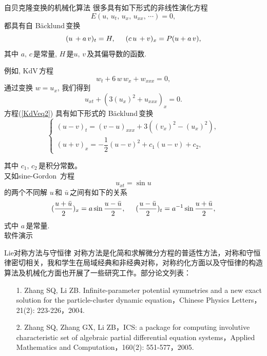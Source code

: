 \documentclass{beamer}
\begin{document}
\begin{frame}{自贝克隆变换的机械化算法}
很多具有如下形式的非线性演化方程
\begin{equation}\label{eq344}
E(u,\,u_t,\,u_x,\,u_{xx},\,\cdots)=0,
\end{equation}
都具有自 B\"{a}cklund\,变换
\begin{equation}\label{eq345}
(u\,+ a\,v)_t = H,\hskip 0.5cm (c\,u\, + v)_x =P(u + a\,v),
\end{equation}
其中 $a,\,c$\,是常量, $H$\,是$u,\,v$\,及其偏导数的函数.

例如, KdV\,方程
\begin{equation}\label{KdV}
w_t+6\,w\,w_x+w_{xxx}=0,
\end{equation}
通过变换 $w=u_x$, 我们得到
\begin{equation}\label{KdVeq2}
u_{xt}+(3(u_x)^2+u_{xxx})_x=0.
\end{equation}
方程(\ref{KdVeq2}) 具有如下形式的 B\"{a}cklund\,变换
\begin{equation}\label{KdV_BT}
\left \{
\begin{array}{ll}
(u-v)_t=(v-u)_{xxx}+3((v_x)^2-(u_x)^2), \\[2mm]
(u+v)_x=-\dfrac{1}{2}(u-v)^2+c_1(u-v)+c_2,
\end{array}
\right.
\end{equation}
\end{frame}
\begin{frame}
其中 $c_1,\,c_2$\,是积分常数。\\[1mm]

又如sine-Gordon\, 方程
\[
  u_{xt} = \sin u
\]
的两个不同解 $u$\,和 $\bar{u}$\,之间有如下的关系
\begin{equation}
(\dfrac{u +\bar{u}}{2})_x = a \sin \dfrac{u-\bar{u}}{2}, \hskip
0.5cm (\dfrac{u-\bar{u}}{2})_t = a^{-1} \sin \dfrac{u + \bar{u}}{2},
\end{equation}
式中 $a$\,是常量.\\[2mm]
\mbox{}  \hskip 3cm  软件演示
\end{frame}

\begin{frame}{Lie对称方法与守恒律}
 对称方法是化简和求解微分方程的普适性方法，对称和守恒律密切相关，我和学生在局域经典和非经典对称，对称约化方面以及守恒律的构造算法及机械化方面也开展了一些研究工作。部分论文列表：
 \begin{itemize}
  \item[1.] Zhang SQ, Li ZB. Infinite-parameter potential symmetries and a new exact solution for the particle-cluster dynamic equation，Chinese Physics Letters，21(2): 223-226，2004.
  \item[2.] Zhang SQ, Zhang GX, Li ZB，ICS: a package for computing involutive characteristic set of algebraic partial differential equation systems，Applied Mathematics and Computation，160(2): 551-577，2005.
 \end{itemize}
\end{frame}
\end{document}
